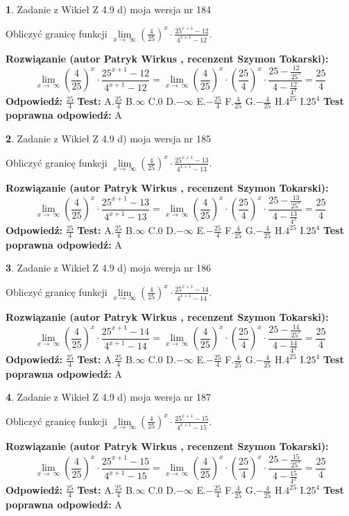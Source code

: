 \documentclass[12pt, a4paper]{article}
\theoremstyle{definition} %
\newtheorem{zad}{}
\newcommand{\zadStart}[1]{\begin{zad}#1\newline}
\newcommand{\zadStop}{\end{zad}}
\newcommand{\rozwStart}[2]{\noindent \textbf{Rozwiązanie (autor #1 , recenzent #2): }\newline}
\newcommand{\rozwStop}{\newline}
\newcommand{\odpStart}{\noindent \textbf{Odpowiedź:}\newline}
\newcommand{\odpStop}{\newline}
\newcommand{\testStart}{\noindent \textbf{Test:}\newline}
\newcommand{\testStop}{\newline}
\newcommand{\kluczStart}{\noindent \textbf{Test poprawna odpowiedź:}\newline}
\newcommand{\kluczStop}{\newline}
\begin{document}
\zadStart{Zadanie z Wikieł Z 4.9 d) moja wersja nr 184}


Obliczyć granicę funkcji  $\lim\limits_{x\to\ \infty}(\frac{4}{25})^{x}\cdot\frac{25^{x+1}-12}{4^{x+1}-12}$.
\zadStop
\rozwStart{Patryk Wirkus}{Szymon Tokarski}
$$\lim\limits_{x\to\ \infty}(\frac{4}{25})^{x}\cdot\frac{25^{x+1}-12}{4^{x+1}-12}=\lim\limits_{x\to\ \infty}(\frac{4}{25})^{x}\cdot(\frac{25}{4})^{x} \cdot \frac{25-\frac{12}{25^{x}}}{4-\frac{12}{4^{x}}} = \frac{25}{4}$$
\rozwStop
\odpStart
$\frac{25}{4}$
\odpStop
\testStart
A.$\frac{25}{4}$ B.$\infty$ C.$0$ D.$-\infty$ E.$-\frac{25}{4}$
F.$\frac{4}{25}$ G.$-\frac{4}{25}$
H.$4^{25}$
I.$25^{4}$
\testStop
\kluczStart
A
\kluczStop



\zadStart{Zadanie z Wikieł Z 4.9 d) moja wersja nr 185}


Obliczyć granicę funkcji  $\lim\limits_{x\to\ \infty}(\frac{4}{25})^{x}\cdot\frac{25^{x+1}-13}{4^{x+1}-13}$.
\zadStop
\rozwStart{Patryk Wirkus}{Szymon Tokarski}
$$\lim\limits_{x\to\ \infty}(\frac{4}{25})^{x}\cdot\frac{25^{x+1}-13}{4^{x+1}-13}=\lim\limits_{x\to\ \infty}(\frac{4}{25})^{x}\cdot(\frac{25}{4})^{x} \cdot \frac{25-\frac{13}{25^{x}}}{4-\frac{13}{4^{x}}} = \frac{25}{4}$$
\rozwStop
\odpStart
$\frac{25}{4}$
\odpStop
\testStart
A.$\frac{25}{4}$ B.$\infty$ C.$0$ D.$-\infty$ E.$-\frac{25}{4}$
F.$\frac{4}{25}$ G.$-\frac{4}{25}$
H.$4^{25}$
I.$25^{4}$
\testStop
\kluczStart
A
\kluczStop



\zadStart{Zadanie z Wikieł Z 4.9 d) moja wersja nr 186}


Obliczyć granicę funkcji  $\lim\limits_{x\to\ \infty}(\frac{4}{25})^{x}\cdot\frac{25^{x+1}-14}{4^{x+1}-14}$.
\zadStop
\rozwStart{Patryk Wirkus}{Szymon Tokarski}
$$\lim\limits_{x\to\ \infty}(\frac{4}{25})^{x}\cdot\frac{25^{x+1}-14}{4^{x+1}-14}=\lim\limits_{x\to\ \infty}(\frac{4}{25})^{x}\cdot(\frac{25}{4})^{x} \cdot \frac{25-\frac{14}{25^{x}}}{4-\frac{14}{4^{x}}} = \frac{25}{4}$$
\rozwStop
\odpStart
$\frac{25}{4}$
\odpStop
\testStart
A.$\frac{25}{4}$ B.$\infty$ C.$0$ D.$-\infty$ E.$-\frac{25}{4}$
F.$\frac{4}{25}$ G.$-\frac{4}{25}$
H.$4^{25}$
I.$25^{4}$
\testStop
\kluczStart
A
\kluczStop



\zadStart{Zadanie z Wikieł Z 4.9 d) moja wersja nr 187}


Obliczyć granicę funkcji  $\lim\limits_{x\to\ \infty}(\frac{4}{25})^{x}\cdot\frac{25^{x+1}-15}{4^{x+1}-15}$.
\zadStop
\rozwStart{Patryk Wirkus}{Szymon Tokarski}
$$\lim\limits_{x\to\ \infty}(\frac{4}{25})^{x}\cdot\frac{25^{x+1}-15}{4^{x+1}-15}=\lim\limits_{x\to\ \infty}(\frac{4}{25})^{x}\cdot(\frac{25}{4})^{x} \cdot \frac{25-\frac{15}{25^{x}}}{4-\frac{15}{4^{x}}} = \frac{25}{4}$$
\rozwStop
\odpStart
$\frac{25}{4}$
\odpStop
\testStart
A.$\frac{25}{4}$ B.$\infty$ C.$0$ D.$-\infty$ E.$-\frac{25}{4}$
F.$\frac{4}{25}$ G.$-\frac{4}{25}$
H.$4^{25}$
I.$25^{4}$
\testStop
\kluczStart
A
\kluczStop
\end{document}
